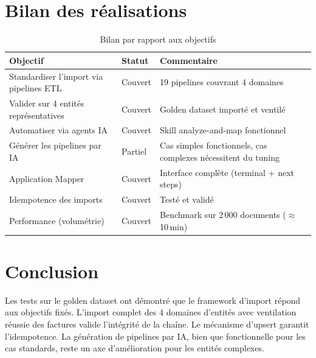\section{Bilan des réalisations}

\begin{table}[H]
  \centering
  \renewcommand{\arraystretch}{1.4}
  \begin{tabular}{p{7cm} p{2.5cm} p{4cm}}
    \toprule
    \rowcolor{gray!20}
    \textbf{Objectif} & \textbf{Statut} & \textbf{Commentaire} \\
    \midrule
    \rowcolor{gray!5}
    Standardiser l'import via pipelines ETL  & Couvert     & 19 pipelines couvrant 4 domaines \\
    Valider sur 4 entités représentatives    & Couvert     & Golden dataset importé et ventilé \\
    \rowcolor{gray!5}
    Automatiser via agents IA                & Couvert     & Skill analyze-and-map fonctionnel \\
    Générer les pipelines par IA             & Partiel     & Cas simples fonctionnels, cas complexes nécessitent du tuning \\
    \rowcolor{gray!5}
    Application Mapper                       & Couvert     & Interface complète (terminal + next steps) \\
    Idempotence des imports                  & Couvert     & Testé et validé \\
    \rowcolor{gray!5}
    Performance (volumétrie)                 & Couvert     & Benchmark sur 2\,000 documents ($\approx$10\,min) \\
    \bottomrule
  \end{tabular}
  \caption{Bilan par rapport aux objectifs}
  \label{tab:bilan}
\end{table}

\section*{Conclusion}

Les tests sur le golden dataset ont démontré que le framework d'import répond aux objectifs fixés. L'import complet des 4 domaines d'entités avec ventilation réussie des factures valide l'intégrité de la chaîne. Le mécanisme d'upsert garantit l'idempotence. La génération de pipelines par IA, bien que fonctionnelle pour les cas standards, reste un axe d'amélioration pour les entités complexes.
